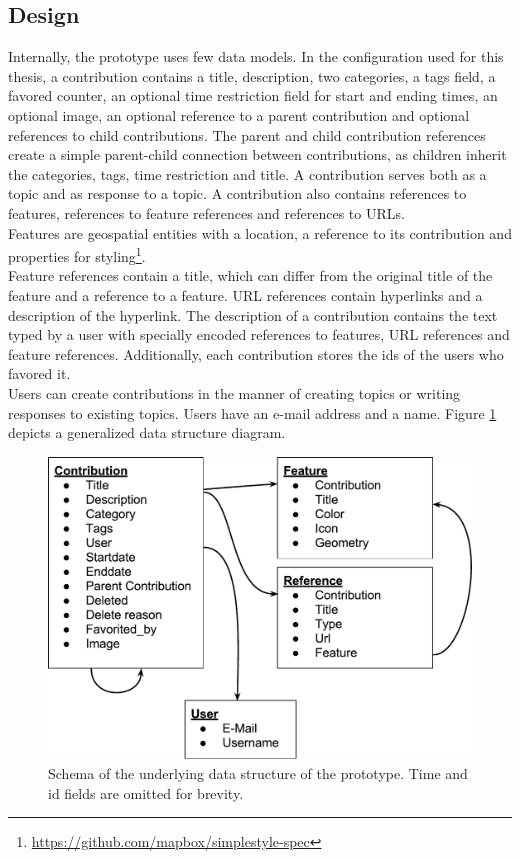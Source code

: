 
\subsection{Design} %
\label{sub:design}

Internally, the prototype uses few data models. In the configuration used for this thesis, a contribution contains a title, description, two categories, a tags field, a favored counter, an optional time restriction field for start and ending times, an optional image, an optional reference to a parent contribution and optional references to child contributions. The parent and child contribution references create a simple parent-child connection between contributions, as children inherit the categories, tags, time restriction and title. A contribution serves both as a topic and as response to a topic. A contribution also contains references to features, references to feature references and references to URLs.\\
Features are geospatial entities with a location, a reference to its contribution and properties for styling\footnote{\url{https://github.com/mapbox/simplestyle-spec}}.\\
Feature references contain a title, which can differ from the original title of the feature and a reference to a feature. URL references contain hyperlinks and a description of the hyperlink. The description of a contribution contains the text typed by a user with specially encoded references to features, URL references and feature references. Additionally, each contribution stores the ids of the users who favored it.\\
Users can create contributions in the manner of creating topics or writing responses to existing topics. Users have an e-mail address and a name. Figure \ref{fig:data_structure} depicts a generalized data structure diagram.

\begin{figure}[!h]
    \centering
    \includegraphics[width=1\columnwidth]{images/data_structure}
    \caption{Schema of the underlying data structure of the prototype. Time and id fields are omitted for brevity.}
    \label{fig:data_structure}
\end{figure}

